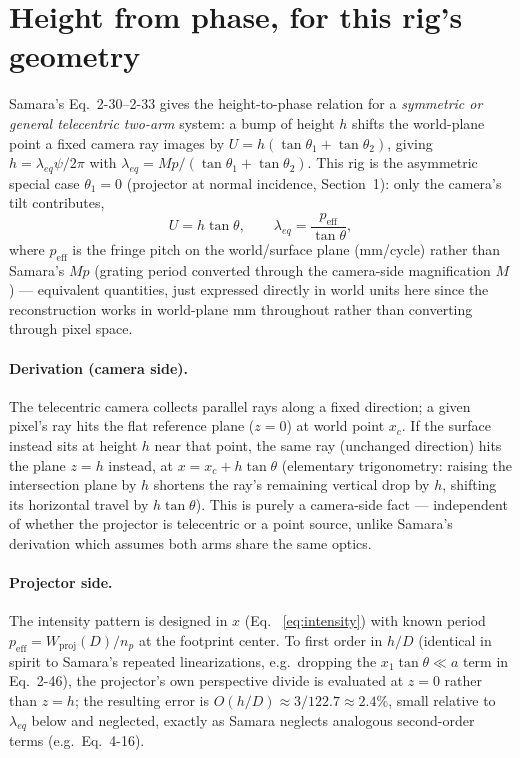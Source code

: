 \documentclass[11pt]{article}
\begin{document}
\section{Height from phase, for this rig's geometry}
\label{sec:height-from-phase}

Samara's Eq.~2-30--2-33 gives the height-to-phase relation for a
\emph{symmetric or general telecentric two-arm} system: a bump of height
$h$ shifts the world-plane point a fixed camera ray images by
$U = h(\tan\theta_1+\tan\theta_2)$, giving
$h = \lambda_{eq}\psi/2\pi$ with $\lambda_{eq} = Mp/(\tan\theta_1+\tan\theta_2)$.
This rig is the asymmetric special case $\theta_1 = 0$ (projector at
normal incidence, Section~1): only the camera's tilt contributes,
\begin{equation}
  U = h\tan\theta, \qquad \lambda_{eq} = \frac{p_{\text{eff}}}{\tan\theta},
\end{equation}
where $p_{\text{eff}}$ is the fringe pitch on the world/surface plane
(mm/cycle) rather than Samara's $Mp$ (grating period converted through the
camera-side magnification $M$) --- equivalent quantities, just expressed
directly in world units here since the reconstruction works in
world-plane mm throughout rather than converting through pixel space.

\paragraph{Derivation (camera side).} The telecentric camera collects
parallel rays along a fixed direction; a given pixel's ray hits the flat
reference plane ($z=0$) at world point $x_c$. If the surface instead sits
at height $h$ near that point, the same ray (unchanged direction) hits the
plane $z=h$ instead, at $x = x_c + h\tan\theta$ (elementary trigonometry:
raising the intersection plane by $h$ shortens the ray's remaining vertical
drop by $h$, shifting its horizontal travel by $h\tan\theta$). This is
purely a camera-side fact --- independent of whether the projector is
telecentric or a point source, unlike Samara's derivation which assumes
both arms share the same optics.

\paragraph{Projector side.} The intensity pattern is designed in $x$ (Eq.~
\ref{eq:intensity}) with known period $p_{\text{eff}} = W_{\text{proj}}(D)/n_p$
at the footprint center. To first order in $h/D$ (identical in spirit to
Samara's repeated linearizations, e.g.\ dropping the $x_1\tan\theta \ll a$
term in Eq.~2-46), the projector's own perspective divide is evaluated at
$z=0$ rather than $z=h$; the resulting error is $O(h/D) \approx 3/122.7 \approx
2.4\%$, small relative to $\lambda_{eq}$ below and neglected, exactly as
Samara neglects analogous second-order terms (e.g.\ Eq.~4-16).
\end{document}
